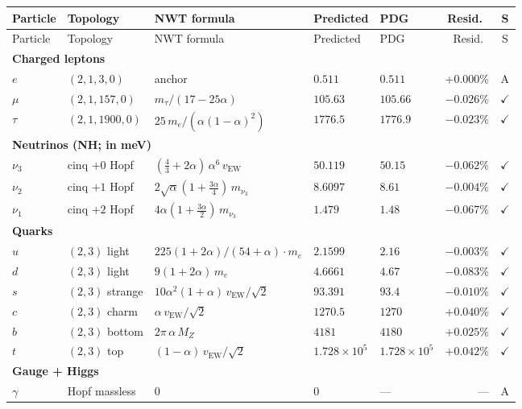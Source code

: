 \documentclass[11pt]{article}
\begin{document}
{\small
\begin{longtable}{@{}p{1.2cm}p{2.4cm}p{4.8cm}p{1.6cm}p{1.4cm}rc@{}}
\toprule
Particle & Topology & NWT formula & Predicted & PDG & Resid.\ & S \\
\midrule
\endfirsthead
\toprule
Particle & Topology & NWT formula & Predicted & PDG & Resid.\ & S \\
\midrule
\endhead
\multicolumn{7}{l}{\textbf{Charged leptons}} \\
$e$ & $(2,1,3,0)$ & anchor & $0.511$ & $0.511$ & +0.000\% & A \\
$\mu$ & $(2,1,157,0)$ & $m_\tau/(17{-}25\alpha)$ & $105.63$ & $105.66$ & $-0.026\%$ & $\checkmark$ \\
$\tau$ & $(2,1,1900,0)$ & $25\,m_e/(\alpha(1{-}\alpha)^2)$ & $1776.5$ & $1776.9$ & $-0.023\%$ & $\checkmark$ \\
\multicolumn{7}{l}{\textbf{Neutrinos (NH; in meV)}} \\
$\nu_3$ & cinq $+0$ Hopf & $(\tfrac{4}{3}{+}2\alpha)\,\alpha^6\,v_\text{EW}$ & $50.119$ & $50.15$ & $-0.062\%$ & $\checkmark$ \\
$\nu_2$ & cinq $+1$ Hopf & $2\sqrt{\alpha}(1{+}\tfrac{3\alpha}{4})\,m_{\nu_3}$ & $8.6097$ & $8.61$ & $-0.004\%$ & $\checkmark$ \\
$\nu_1$ & cinq $+2$ Hopf & $4\alpha(1{+}\tfrac{3\alpha}{2})\,m_{\nu_3}$ & $1.479$ & $1.48$ & $-0.067\%$ & $\checkmark$ \\
\multicolumn{7}{l}{\textbf{Quarks}} \\
$u$ & $(2,3)$ light & $225(1{+}2\alpha)/(54{+}\alpha)\cdot m_e$ & $2.1599$ & $2.16$ & $-0.003\%$ & $\checkmark$ \\
$d$ & $(2,3)$ light & $9(1{+}2\alpha)\,m_e$ & $4.6661$ & $4.67$ & $-0.083\%$ & $\checkmark$ \\
$s$ & $(2,3)$ strange & $10\alpha^2(1{+}\alpha)\,v_\text{EW}/\sqrt{2}$ & $93.391$ & $93.4$ & $-0.010\%$ & $\checkmark$ \\
$c$ & $(2,3)$ charm & $\alpha\,v_\text{EW}/\sqrt{2}$ & $1270.5$ & $1270$ & $+0.040\%$ & $\checkmark$ \\
$b$ & $(2,3)$ bottom & $2\pi\,\alpha\,M_Z$ & $4181$ & $4180$ & $+0.025\%$ & $\checkmark$ \\
$t$ & $(2,3)$ top & $(1{-}\alpha)\,v_\text{EW}/\sqrt{2}$ & $1.728{\times}10^5$ & $1.728{\times}10^5$ & $+0.042\%$ & $\checkmark$ \\
\multicolumn{7}{l}{\textbf{Gauge + Higgs}} \\
$\gamma$ & Hopf massless & $0$ & $0$ & --- & --- & A \\

\end{longtable}}
\end{document}
